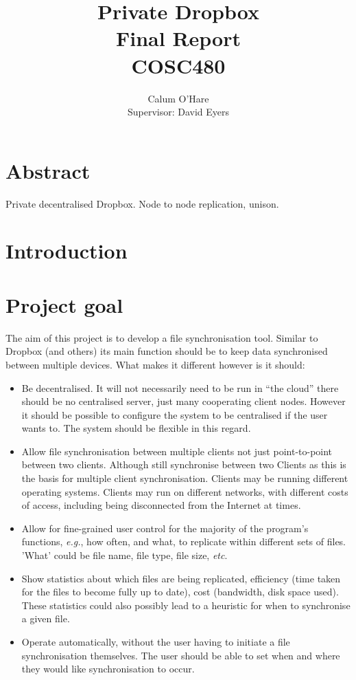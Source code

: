 \documentclass[12pt]{article}
\title{ Private Dropbox \\ Final Report \\ COSC480}
\author{Calum O'Hare \\ Supervisor: David Eyers}
\date{}
\begin{document}
\maketitle

\section{Abstract}
Private decentralised Dropbox. Node to node replication, unison.

\newpage

\tableofcontents
\newpage

\section{Introduction}
\section{Project goal}
The aim of this project is to develop a file synchronisation tool.
Similar to  Dropbox (and others) its main function should be to
keep data synchronised between multiple devices.
What makes it different however is it should:
\begin{itemize}
\item Be decentralised. It will not necessarily need to be run in ``the cloud'' there should be
no centralised server, just many cooperating client nodes. However it should be
possible to configure the system to be centralised if the user wants to. The
system should be flexible in this regard.

\item Allow file synchronisation between multiple clients not just point-to-point
between two clients. Although still synchronise between two Clients as this is the
basis for multiple client synchronisation. Clients may be
running different operating systems. Clients may run on different networks, with different costs of access, including being disconnected from the Internet at times.

\item Allow for fine-grained user control for the majority of the program's
functions, \emph{e.g.}, how often, and what, to replicate within different sets of files. 'What' could be file name, file type, file size, \emph{etc}.

\item Show statistics about which files are being replicated, efficiency (time
taken for the files to become fully up to date),
cost (bandwidth, disk space used). These statistics could also possibly lead
to a heuristic for when to synchronise a given file.

\item Operate automatically, without the user having to initiate a file
synchronisation themselves. The user should be able to set when and
where they would like synchronisation to occur.
\end{itemize}
\end{document}
